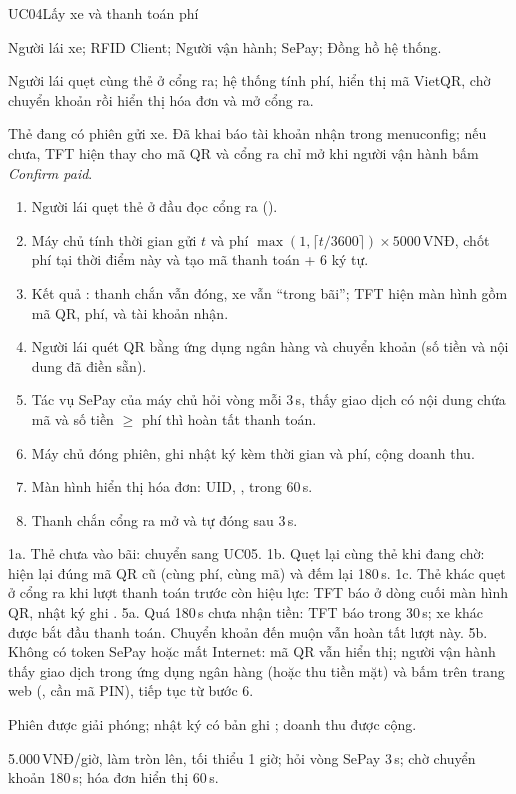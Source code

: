 \begin{usecase}{UC04}{Lấy xe và thanh toán phí}
\item[Tác nhân] Người lái xe; RFID Client; Người vận hành; SePay; Đồng hồ hệ thống.
\item[Mô tả] Người lái quẹt cùng thẻ ở cổng ra; hệ thống tính phí, hiển thị mã VietQR,
  chờ chuyển khoản rồi hiển thị hóa đơn và mở cổng ra.
\item[Tiền điều kiện] Thẻ đang có phiên gửi xe. Đã khai báo tài khoản nhận trong menuconfig;
  nếu chưa, TFT hiện  thay cho mã QR và cổng ra chỉ mở khi người vận hành bấm \emph{Confirm paid}.
\item[Luồng chính] \begin{enumerate}[nosep,leftmargin=1.3em]
  \item Người lái quẹt thẻ ở đầu đọc cổng ra ().
  \item Máy chủ tính thời gian gửi $t$ và phí $\max(1,\lceil t/3600\rceil)\times5000$\,VNĐ,
        chốt phí tại thời điểm này và tạo mã thanh toán  + 6 ký tự.
  \item Kết quả : thanh chắn vẫn đóng, xe vẫn ``trong bãi''; TFT
        hiện màn hình  gồm mã QR, phí,  và
        tài khoản nhận.
  \item Người lái quét QR bằng ứng dụng ngân hàng và chuyển khoản (số tiền và nội dung
        đã điền sẵn).
  \item Tác vụ SePay của máy chủ hỏi vòng mỗi 3\,s, thấy giao dịch có nội dung chứa mã
        và số tiền $\ge$ phí thì hoàn tất thanh toán.
  \item Máy chủ đóng phiên, ghi nhật ký  kèm thời gian và phí, cộng doanh thu.
  \item Màn hình hiển thị hóa đơn: UID, ,  trong 60\,s.
  \item Thanh chắn cổng ra mở và tự đóng sau 3\,s.
\end{enumerate}
\item[Ngoại lệ] 1a. Thẻ chưa vào bãi: chuyển sang UC05.
  1b. Quẹt lại cùng thẻ khi đang chờ: hiện lại đúng mã QR cũ (cùng phí, cùng mã) và đếm lại 180\,s.
  1c. Thẻ khác quẹt ở cổng ra khi lượt thanh toán trước còn hiệu lực: TFT báo
       ở dòng cuối màn hình QR, nhật ký ghi .
  5a. Quá 180\,s chưa nhận tiền: TFT báo 
      trong 30\,s; xe khác được bắt đầu thanh toán. Chuyển khoản đến muộn vẫn hoàn tất lượt này.
  5b. Không có token SePay hoặc mất Internet: mã QR vẫn hiển thị; người vận hành thấy giao
      dịch trong ứng dụng ngân hàng (hoặc thu tiền mặt) và bấm  trên trang web
      (, cần mã PIN), tiếp tục từ bước 6.
\item[Hậu điều kiện] Phiên được giải phóng; nhật ký có bản ghi ; doanh thu được cộng.
\item[Thông số] 5.000\,VNĐ/giờ, làm tròn lên, tối thiểu 1 giờ; hỏi vòng SePay 3\,s; chờ
  chuyển khoản 180\,s; hóa đơn hiển thị 60\,s.
\end{usecase}

